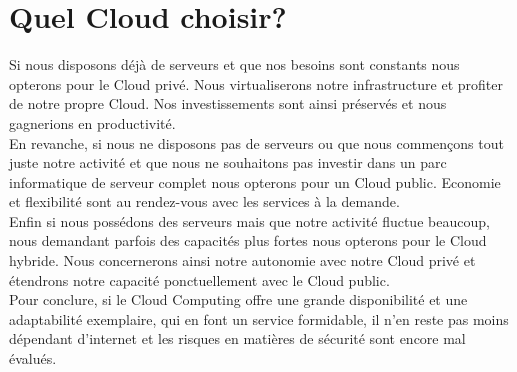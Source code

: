   \section{Quel Cloud choisir?}
  Si nous disposons déjà de serveurs et que nos besoins sont constants nous opterons pour le Cloud privé. Nous virtualiserons notre infrastructure et profiter de notre propre Cloud. Nos investissements sont ainsi préservés et nous gagnerions en productivité.\\

  En revanche, si nous ne disposons pas de serveurs ou que nous commençons tout juste notre activité et que nous ne souhaitons pas investir dans un parc informatique de serveur complet nous opterons pour un Cloud public. Economie et flexibilité sont au rendez-vous avec les services à la demande.\\

  Enfin si nous possédons des serveurs mais que notre activité fluctue beaucoup, nous demandant parfois des capacités plus fortes nous opterons pour le Cloud hybride. Nous concernerons ainsi notre autonomie avec notre Cloud privé et étendrons notre capacité ponctuellement avec le Cloud public.\\

  Pour conclure, si le Cloud Computing offre une grande disponibilité et une adaptabilité exemplaire, qui en font un service formidable, il n’en reste pas moins dépendant d’internet et les risques en matières de sécurité sont encore mal évalués.
